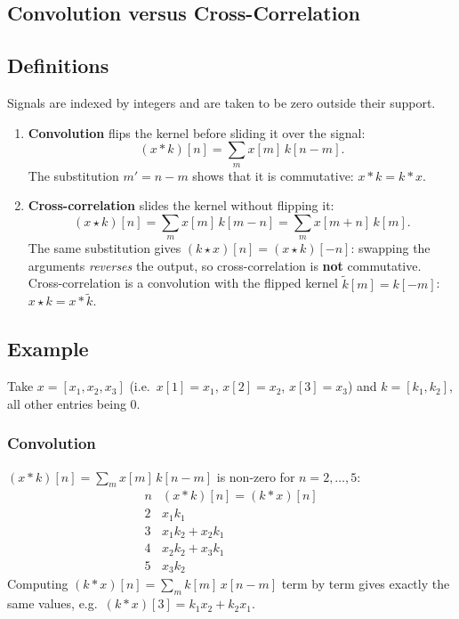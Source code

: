 \begin{notechapter}
\chapter{Convolution versus Cross-Correlation}\label{ch:convolution-vs-correlation}

\section{Definitions}

Signals are indexed by integers and are taken to be zero outside their support.

\begin{enumerate}
\item \textbf{Convolution} flips the kernel before sliding it over the signal:
\[
(x * k)[n] = \sum_{m} x[m] \, k[n - m].
\]
The substitution $m' = n - m$ shows that it is commutative: \( x * k = k * x \).

\item \textbf{Cross-correlation} slides the kernel without flipping it:
\[
(x \star k)[n] = \sum_{m} x[m] \, k[m - n] = \sum_{m} x[m+n]\, k[m].
\]
The same substitution gives \( (k \star x)[n] = (x \star k)[-n] \): swapping the
arguments \emph{reverses} the output, so cross-correlation is \textbf{not}
commutative. Cross-correlation is a convolution with the flipped kernel
$\tilde{k}[m] = k[-m]$: \( x \star k = x * \tilde{k} \).
\end{enumerate}

\section{Example}

Take \( x = [x_1, x_2, x_3] \) (i.e.\ $x[1]=x_1$, $x[2]=x_2$, $x[3]=x_3$) and
\( k = [k_1, k_2] \), all other entries being $0$.

\subsection{Convolution}
\( (x * k)[n] = \sum_m x[m]\,k[n-m] \) is non-zero for $n = 2, \dots, 5$:
\[
\begin{array}{c|c}
n & (x * k)[n] = (k * x)[n] \\ \hline
2 & x_1 k_1 \\
3 & x_1 k_2 + x_2 k_1 \\
4 & x_2 k_2 + x_3 k_1 \\
5 & x_3 k_2
\end{array}
\]
Computing \( (k * x)[n] = \sum_m k[m]\,x[n-m] \) term by term gives exactly the same
values, e.g.\ \( (k * x)[3] = k_1 x_2 + k_2 x_1 \).


\end{notechapter}
